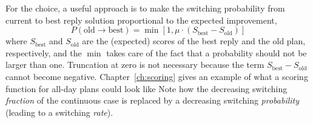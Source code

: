 For the choice, a useful approach is to make the switching probability from
current to best reply solution proportional to the
expected improvement, \ie
\[
P(\text{old} \to \text{best}) = \min[ 1, \mu \cdot (S_\text{best} -
S_\text{old}) ]
\]
where $S_\text{best}$ and $S_\text{old}$ are the (expected) scores of the best reply
and the old plan, respectively, and the $\min$ takes care of the fact that a probability should not be larger than one. %
Truncation at zero is not necessary because the term $S_\text{best} -
S_\text{old}$ cannot become negative.
Chapter~\ref{ch:scoring} %
gives an example of what a scoring function for all-day plans could
look like
Note how
the decreasing switching \emph{fraction} of the continuous case is
replaced by a decreasing switching \emph{probability} (leading to a switching \emph{rate}).

